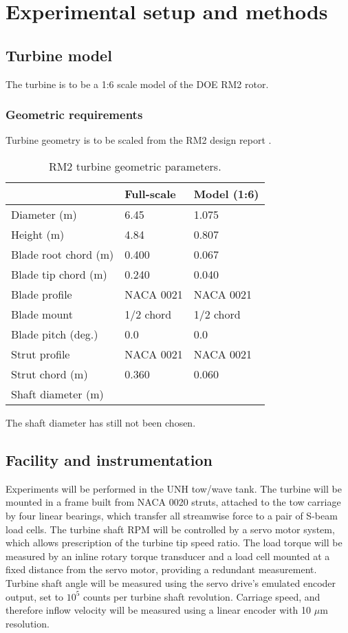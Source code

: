 \documentclass{article}
\begin{document}
\section{Experimental setup and methods}

\subsection{Turbine model}

The turbine is to be a 1:6 scale model of the DOE RM2 rotor.

\subsubsection{Geometric requirements}

Turbine geometry is to be scaled from the RM2 design report \cite{Barone2011}.

\begin{table}[ht]
\centering
\begin{tabular}{l|l|l}
   & Full-scale & Model (1:6) \\
\hline 
Diameter (m)   & 6.45 & 1.075 \\ 
Height (m)     & 4.84 & 0.807 \\ 
Blade root chord (m) & 0.400 & 0.067 \\ 
Blade tip chord (m)  & 0.240 & 0.040 \\ 
Blade profile & NACA 0021 & NACA 0021 \\ 
Blade mount & 1/2 chord & 1/2 chord \\ 
Blade pitch (deg.) & 0.0 & 0.0 \\ 
Strut profile & NACA 0021 & NACA 0021 \\ 
Strut chord (m) & 0.360 & 0.060 \\ 
Shaft diameter (m) &  &  \\ 
\end{tabular}
\caption{RM2 turbine geometric parameters.}
\end{table}

The shaft diameter has still not been chosen.


\subsection{Facility and instrumentation}

Experiments will be performed in the UNH tow/wave tank. The turbine will be
mounted in a frame built from NACA 0020 struts, attached to the tow carriage by
four linear bearings, which transfer all streamwise force to a pair of S-beam
load cells. The turbine shaft RPM will be controlled by a servo motor system,
which allows prescription of the turbine tip speed ratio. The load torque will
be measured by an inline rotary torque transducer and a load cell mounted at a
fixed distance from the servo motor, providing a redundant measurement. Turbine
shaft angle will be measured using the servo drive's emulated encoder output,
set to $10^5$ counts per turbine shaft revolution. Carriage speed, and therefore
inflow velocity will be measured using a linear encoder with 10 $\mu$m
resolution.
\end{document}

